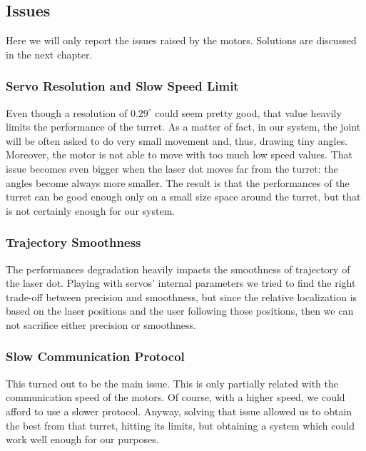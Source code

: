 \subsection{Issues}\label{subs:firstModel:issues}
Here we will only report the issues raised by the motors. Solutions are discussed in the next chapter.
\subsubsection{Servo Resolution and Slow Speed Limit}
Even though a resolution of $0.29^{\circ}$ could seem pretty good, that value heavily limits the performance of the turret. As a matter of fact, in our system, the joint will be often asked to do very small movement and, thus, drawing tiny angles. Moreover, the motor is not able to move with too much low speed values. That issue becomes even bigger when the laser dot moves far from the turret: the angles become always more smaller. The result is that the performances of the turret can be good enough only on a small size space around the turret, but that is not certainly enough for our system.
\subsubsection{Trajectory Smoothness}
The performances degradation heavily impacts the smoothness of trajectory of the laser dot. Playing with servos' internal parameters we tried to find the right trade-off between precision and smoothness, but since the relative localization is based on the laser positions and the user following those positions, then we can not sacrifice either precision or smoothness.
\subsubsection{Slow Communication Protocol}
This turned out to be the main issue. This is only partially related with the communication speed of the motors. Of course, with a higher speed, we could afford to use a slower protocol. Anyway, solving that issue allowed us to obtain the best from that turret, hitting its limits, but obtaining a system which could work well enough for our purposes.

